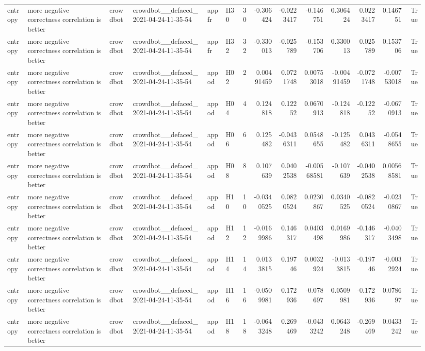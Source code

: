 \begin{longtable}{llllllrrrrrrrr}
entropy & more negative correctness correlation is better & crowdbot & crowdbot\_\_defaced\_2021-04-24-11-35-54 & appfr & H30 & 30 & -0.306424 & -0.0223417 & -0.146751 & 0.306424 & 0.0223417 & 0.146751 & True \\
entropy & more negative correctness correlation is better & crowdbot & crowdbot\_\_defaced\_2021-04-24-11-35-54 & appfr & H32 & 32 & -0.330013 & -0.025789 & -0.153706 & 0.330013 & 0.025789 & 0.153706 & True \\
entropy & more negative correctness correlation is better & crowdbot & crowdbot\_\_defaced\_2021-04-24-11-35-54 & appod & H02 & 2 & 0.00491459 & 0.0721748 & 0.00753018 & -0.00491459 & -0.0721748 & -0.00753018 & True \\
entropy & more negative correctness correlation is better & crowdbot & crowdbot\_\_defaced\_2021-04-24-11-35-54 & appod & H04 & 4 & 0.124818 & 0.12252 & 0.0670913 & -0.124818 & -0.12252 & -0.0670913 & True \\
entropy & more negative correctness correlation is better & crowdbot & crowdbot\_\_defaced\_2021-04-24-11-35-54 & appod & H06 & 6 & 0.125482 & -0.0436311 & 0.0548655 & -0.125482 & 0.0436311 & -0.0548655 & True \\
entropy & more negative correctness correlation is better & crowdbot & crowdbot\_\_defaced\_2021-04-24-11-35-54 & appod & H08 & 8 & 0.107639 & 0.0402538 & -0.00568581 & -0.107639 & -0.0402538 & 0.00568581 & True \\
entropy & more negative correctness correlation is better & crowdbot & crowdbot\_\_defaced\_2021-04-24-11-35-54 & appod & H10 & 10 & -0.0340525 & 0.0820524 & 0.0230867 & 0.0340525 & -0.0820524 & -0.0230867 & True \\
entropy & more negative correctness correlation is better & crowdbot & crowdbot\_\_defaced\_2021-04-24-11-35-54 & appod & H12 & 12 & -0.0169986 & 0.146317 & 0.0403498 & 0.0169986 & -0.146317 & -0.0403498 & True \\
entropy & more negative correctness correlation is better & crowdbot & crowdbot\_\_defaced\_2021-04-24-11-35-54 & appod & H14 & 14 & 0.0133815 & 0.19746 & 0.0032924 & -0.0133815 & -0.19746 & -0.0032924 & True \\
entropy & more negative correctness correlation is better & crowdbot & crowdbot\_\_defaced\_2021-04-24-11-35-54 & appod & H16 & 16 & -0.0509981 & 0.172936 & -0.078697 & 0.0509981 & -0.172936 & 0.078697 & True \\
entropy & more negative correctness correlation is better & crowdbot & crowdbot\_\_defaced\_2021-04-24-11-35-54 & appod & H18 & 18 & -0.0643248 & 0.269469 & -0.0433242 & 0.0643248 & -0.269469 & 0.0433242 & True \\

\end{longtable}
